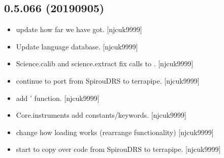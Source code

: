 \documentclass[a4paper,10pt,english]{report}
\begin{document}
\subsection{0.5.066 (2019\sphinxhyphen{}09\sphinxhyphen{}05)}
\label{\detokenize{misc/changelog:id96}}\begin{itemize}
\item {} 
 \sphinxhyphen{} update how far we have got. {[}njcuk9999{]}

\item {} 
Update language database. {[}njcuk9999{]}

\item {} 
Science.calib and science.extract \sphinxhyphen{} fix calls to .
{[}njcuk9999{]}

\item {} 
 \sphinxhyphen{} continue to port from SpirouDRS to
terrapipe. {[}njcuk9999{]}

\item {} 
 \sphinxhyphen{} add ’ function. {[}njcuk9999{]}

\item {} 
Core.instruments \sphinxhyphen{} add  constants/keywords. {[}njcuk9999{]}

\item {} 
 \sphinxhyphen{} change how loading works (rearrange
functionality) {[}njcuk9999{]}

\item {} 
 \sphinxhyphen{} start to copy over code from SpirouDRS to
terrapipe. {[}njcuk9999{]}

\end{itemize}
\end{document}

